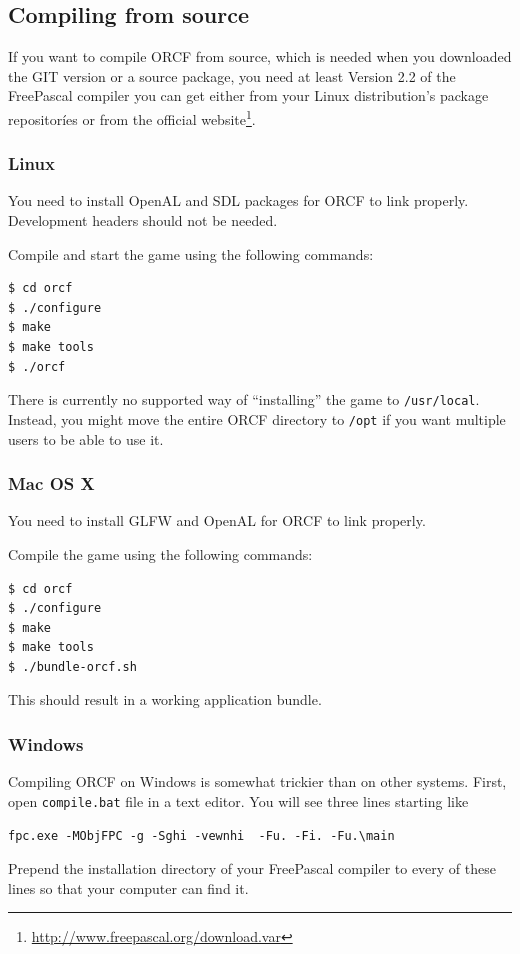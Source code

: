 \documentclass[a4paper]{article}
\newcommand{\cfile}[1]{\texttt{#1}}
\begin{document}
\subsection{Compiling from source}
If you want to compile ORCF from source, which is needed when you downloaded the GIT version or a source package, you need at least Version
2.2 of the FreePascal compiler you can get either from your Linux distribution's package repositoríes or from the official
website\footnote{\url{http://www.freepascal.org/download.var}}.

\subsubsection{Linux}
You need to install OpenAL and SDL packages for ORCF to link properly. Development headers should not be needed.

Compile and start the game using the following commands:
\begin{lstlisting}
$ cd orcf
$ ./configure
$ make
$ make tools
$ ./orcf
\end{lstlisting}
There is currently no supported way of ``installing'' the game to \cfile{/usr/local}. Instead, you might move the entire ORCF directory to
\texttt{/opt} if you want multiple users to be able to use it.

\subsubsection{Mac OS X}
You need to install GLFW and OpenAL for ORCF to link properly.

Compile the game using the following commands:
\begin{lstlisting}
$ cd orcf
$ ./configure
$ make
$ make tools
$ ./bundle-orcf.sh
\end{lstlisting}
This should result in a working application bundle.

\subsubsection{Windows}
Compiling ORCF on Windows is somewhat trickier than on other systems. First, open \cfile{compile.bat} file in a text editor. You will see
three lines starting like
\begin{lstlisting}
fpc.exe -MObjFPC -g -Sghi -vewnhi  -Fu. -Fi. -Fu.\main 
\end{lstlisting}
Prepend the installation directory of your FreePascal compiler to every of these lines so that your computer can find it.
\end{document}
